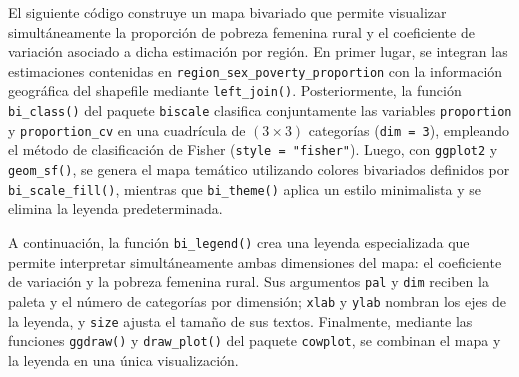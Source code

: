 \documentclass[
  spanish,
  11pt,
  letterpaper,
  oneside,
  open=any]{scrbook}
\begin{document}
El siguiente código construye un mapa bivariado que permite visualizar
simultáneamente la proporción de pobreza femenina rural y el coeficiente
de variación asociado a dicha estimación por región. En primer lugar, se
integran las estimaciones contenidas en
\texttt{region\_sex\_poverty\_proportion} con la información geográfica
del shapefile mediante \texttt{left\_join()}. Posteriormente, la función
\texttt{bi\_class()} del paquete \texttt{biscale} clasifica
conjuntamente las variables \texttt{proportion} y
\texttt{proportion\_cv} en una cuadrícula de \((3 \times 3)\) categorías
(\texttt{dim\ =\ 3}), empleando el método de clasificación de Fisher
(\texttt{style\ =\ "fisher"}). Luego, con \texttt{ggplot2} y
\texttt{geom\_sf()}, se genera el mapa temático utilizando colores
bivariados definidos por \texttt{bi\_scale\_fill()}, mientras que
\texttt{bi\_theme()} aplica un estilo minimalista y se elimina la
leyenda predeterminada.

A continuación, la función \texttt{bi\_legend()} crea una leyenda
especializada que permite interpretar simultáneamente ambas dimensiones
del mapa: el coeficiente de variación y la pobreza femenina rural. Sus
argumentos \texttt{pal} y \texttt{dim} reciben la paleta y el número de
categorías por dimensión; \texttt{xlab} y \texttt{ylab} nombran los ejes
de la leyenda, y \texttt{size} ajusta el tamaño de sus textos.
Finalmente, mediante las funciones \texttt{ggdraw()} y
\texttt{draw\_plot()} del paquete \texttt{cowplot}, se combinan el mapa
y la leyenda en una única visualización.
\end{document}
